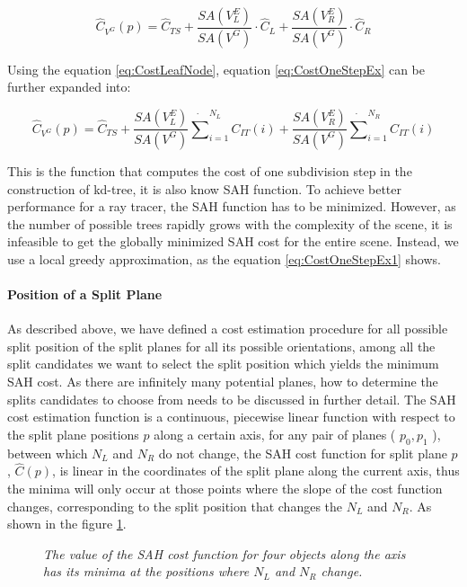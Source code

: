 \begin{equation} 
    \label{eq:CostOneStepEx}
    \hat{C}_{V^{G}}(p) = \hat{C}_{TS} + \frac{SA(V^{E}_{L})}{SA(V^{G})} \cdot \hat{C}_{L} + \frac{SA(V^{E}_{R})}{SA(V^{G})} \cdot \hat{C}_{R}
\end{equation}

Using the equation \ref{eq:CostLeafNode}, equation \ref{eq:CostOneStepEx} can be further expanded into:

\begin{equation} 
    \label{eq:CostOneStepEx1}
    \hat{C}_{V^{G}}(p) = \hat{C}_{TS} + \frac{SA(V^{E}_{L})}{SA(V^{G})} \dot \sum_{i=1}^{N_{L}} C_{IT}(i) + \frac{SA(V^{E}_{R})}{SA(V^{G})} \dot \sum_{i=1}^{N_{R}} C_{IT}(i)
\end{equation}

This is the function that computes the cost of one subdivision step in the construction of kd-tree, it is also know SAH function. To achieve better performance for a ray tracer, the SAH function has to be minimized. However, as the number of possible trees rapidly grows with the complexity of the scene, it is infeasible to get the globally minimized SAH cost for the entire scene. Instead, we use a local greedy approximation, as the equation \ref{eq:CostOneStepEx1} shows. 

\paragraph{Position of a Split Plane}
As described above, we have defined a cost estimation procedure for all possible split position of the split planes for all its possible orientations, among all the split candidates we want to select the split position which yields the minimum SAH cost. As there are infinitely many potential planes, how to determine the splits candidates to choose from needs to be discussed in further detail. The SAH cost estimation function is a continuous, piecewise linear function with respect to the split plane positions \( p \) along a certain axis, for any pair of planes ( \( p_{0}, p_{1} \) ), between which \( N_{L} \) and \( N_{R} \) do not change, the SAH cost function for split plane \( p \), \( \hat{C}(p) \), is linear in the coordinates of the split plane along the current axis, thus the minima will only occur at those points where the slope of the cost function changes, corresponding to the split position that changes the \( N_{L} \) and \( N_{R} \). As shown in the figure \ref{fig:SplitPositionsCost}.

\begin{figure}[htp] 
    \centering 
    \label{fig:SplitPositionsCost} 
    \renewcommand{\thefigure}{\thechapter.\arabic{figure}}
    \caption[SAH Cost Values of Split Positions]{\emph{The value of the SAH cost function for four objects along the axis has its minima at the positions where \( N_{L} \) and \( N_{R} \) change.}}
\end{figure}

